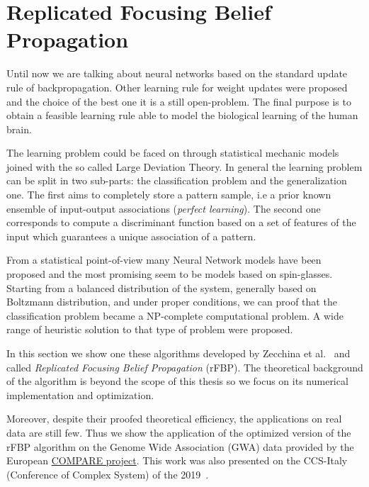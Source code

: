 \documentclass{standalone}
\begin{document}
\section[rFBP]{Replicated Focusing Belief Propagation}\label{rfbp:rfbp}

Until now we are talking about neural networks based on the standard update rule of backpropagation.
Other learning rule for weight updates were proposed and the choice of the best one it is a still open-problem.
The final purpose is to obtain a feasible learning rule able to model the biological learning of the human brain.

The learning problem could be faced on through statistical mechanic models joined with the so called Large Deviation Theory.
In general the learning problem can be split in two sub-parts: the classification problem and the generalization one.
The first aims to completely store a pattern sample, i.e a prior known ensemble of input-output associations (\emph{perfect learning}).
The second one corresponds to compute a discriminant function based on a set of features of the input which guarantees a unique association of a pattern.

From a statistical point-of-view many Neural Network models have been proposed and the most promising seem to be models based on spin-glasses.
Starting from a balanced distribution of the system, generally based on Boltzmann distribution, and under proper conditions, we can proof that the classification problem became a NP-complete computational problem.
A wide range of heuristic solution to that type of problem were proposed.

In this section we show one these algorithms developed by Zecchina et al.~\cite{BaldassiE7655} and called \emph{Replicated Focusing Belief Propagation} (rFBP).
The theoretical background of the algorithm is beyond the scope of this thesis so we focus on its numerical implementation and optimization.

Moreover, despite their proofed theoretical efficiency, the applications on real data are still few.
Thus we show the application of the optimized version of the rFBP algorithm on the Genome Wide Association (GWA) data provided by the European \href{https://www.compare-europe.eu/}{COMPARE project}.
This work was also presented on the CCS-Italy (Conference of Complex System) of the 2019~\cite{DallOlioCCS19}.
\end{document}
